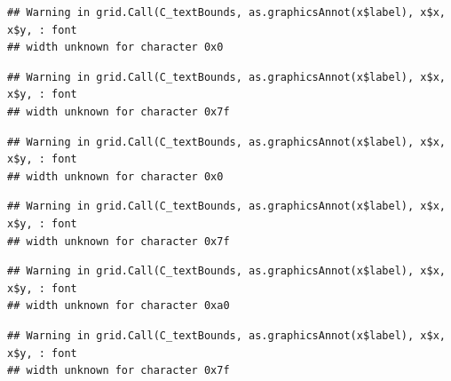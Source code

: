 \documentclass[]{article}
\newenvironment{Shaded}{\begin{snugshade}}{\end{snugshade}}
\newcommand{\CommentTok}[1]{\textcolor[rgb]{0.56,0.35,0.01}{\textit{#1}}}
\newcommand{\DataTypeTok}[1]{\textcolor[rgb]{0.13,0.29,0.53}{#1}}
\newcommand{\DecValTok}[1]{\textcolor[rgb]{0.00,0.00,0.81}{#1}}
\newcommand{\KeywordTok}[1]{\textcolor[rgb]{0.13,0.29,0.53}{\textbf{#1}}}
\newcommand{\NormalTok}[1]{#1}
\newcommand{\OperatorTok}[1]{\textcolor[rgb]{0.81,0.36,0.00}{\textbf{#1}}}
\newcommand{\StringTok}[1]{\textcolor[rgb]{0.31,0.60,0.02}{#1}}
\begin{document}
\begin{Shaded}
\end{Shaded}

\begin{verbatim}
## Warning in grid.Call(C_textBounds, as.graphicsAnnot(x$label), x$x, x$y, : font
## width unknown for character 0x0
\end{verbatim}

\begin{verbatim}
## Warning in grid.Call(C_textBounds, as.graphicsAnnot(x$label), x$x, x$y, : font
## width unknown for character 0x7f
\end{verbatim}

\begin{verbatim}
## Warning in grid.Call(C_textBounds, as.graphicsAnnot(x$label), x$x, x$y, : font
## width unknown for character 0x0
\end{verbatim}

\begin{verbatim}
## Warning in grid.Call(C_textBounds, as.graphicsAnnot(x$label), x$x, x$y, : font
## width unknown for character 0x7f
\end{verbatim}

\begin{verbatim}
## Warning in grid.Call(C_textBounds, as.graphicsAnnot(x$label), x$x, x$y, : font
## width unknown for character 0xa0
\end{verbatim}

\begin{verbatim}
## Warning in grid.Call(C_textBounds, as.graphicsAnnot(x$label), x$x, x$y, : font
## width unknown for character 0x7f
\end{verbatim}
\end{document}
